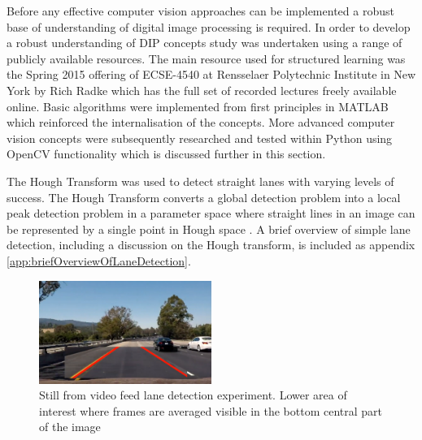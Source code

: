 \documentclass[]{aiaa-tc}%
\begin{document}
Before any effective computer vision approaches can be implemented a robust base of understanding of digital image processing is required. In order to develop a robust understanding of DIP concepts study was undertaken using a range of publicly available resources. The main resource used for structured learning was the Spring 2015 offering of ECSE-4540 at Rensselaer Polytechnic Institute in New York by Rich Radke which has the full set of recorded lectures freely available online. Basic algorithms were implemented from first principles in MATLAB which reinforced the internalisation of the concepts. More advanced computer vision concepts were subsequently researched and tested within Python using OpenCV functionality which is discussed further in this section. 

The Hough Transform was used to detect straight lanes with varying levels of success. The Hough Transform converts a global detection problem into a local peak detection problem in a parameter space \citep{surveyOfHT} where straight lines in an image can be represented by a single point in Hough space \citep{houghPaper}. A brief overview of simple lane detection, including a discussion on the Hough transform, is included as appendix \ref{app:briefOverviewOfLaneDetection}.

\begin{figure} %
	\centering
	\includegraphics[width=0.5\textwidth, height=0.5\textwidth]{early_lane_detection_experiment.png}
	\caption{Still from video feed lane detection experiment. Lower area of interest where frames are averaged visible in the bottom central part of the image}
	\label{f:simpleLaneDetectionHough}
\end{figure}
\end{document}
